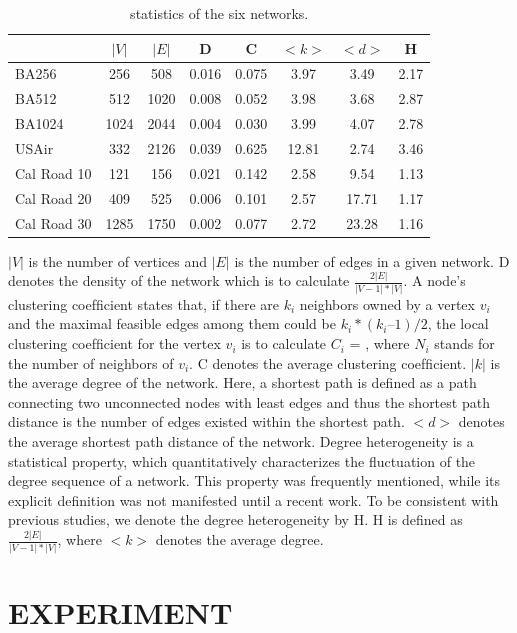 \documentclass[onecolumn,preprintnumbers,amsmath,amssymb]{revtex4}
\begin{document}
\begin{table}[tbp]
\centering  %
\begin{tabular}{lccccccc}  %
\hline  %
&$|V|$ &$|E|$ &D &C &$<k>$ &$<d>$ &H\\ 
\hline  BA256 &256 &508 &0.016 &0.075 &3.97 &3.49 &2.17 \\  
\hline  BA512 &512 &1020 &0.008 &0.052 &3.98 &3.68 &2.87 \\
\hline  BA1024 &1024 &2044 &0.004 &0.030 &3.99 &4.07 &2.78\\
\hline USAir &332 &2126 &0.039 &0.625 &12.81 &2.74 &3.46\\
\hline Cal Road 10 &121 &156 &0.021 &0.142 &2.58 &9.54 &1.13\\
\hline Cal Road 20 &409 &525 &0.006 &0.101 &2.57 &17.71 &1.17\\
\hline Cal Road 30 &1285 &1750 &0.002 &0.077 &2.72 &23.28 &1.16\\
\hline
\end{tabular}
\caption{statistics of the six networks.}
\end{table}

$|V|$ is the number of vertices and $|E|$ is the number of edges in a given network. D denotes the density of the network which is to calculate $\frac{2|E|}{|V-1|*|V|}$. A node’s clustering coefﬁcient states that, if there are $k_i$ neighbors owned by a vertex $v_i$ and the maximal feasible edges among them could be $k_i*(k_i – 1)/2$, the local clustering coefﬁcient for the vertex $v_i$ is to calculate $C_i$ = \cite{SW}, where $N_i$ stands for the number of neighbors of $v_i$. C denotes the average clustering coefﬁcient. $|k|$ is the average degree of the network. Here, a shortest path is deﬁned as a path connecting two unconnected nodes with least edges and thus the shortest path distance is the number of edges existed within the shortest path. $<d>$ denotes the average shortest path distance of the network. Degree heterogeneity is a statistical property, which quantitatively characterizes the fluctuation of the degree sequence of a network. This property was frequently mentioned, while its explicit definition was not manifested until a recent work\cite{PML}. To be consistent with previous studies, we denote the degree heterogeneity by H. H is defined as $\frac{2|E|}{|V-1|*|V|}$, where $<k>$ denotes the average degree\cite{KD}.



\section*{EXPERIMENT\protect}
\end{document}
